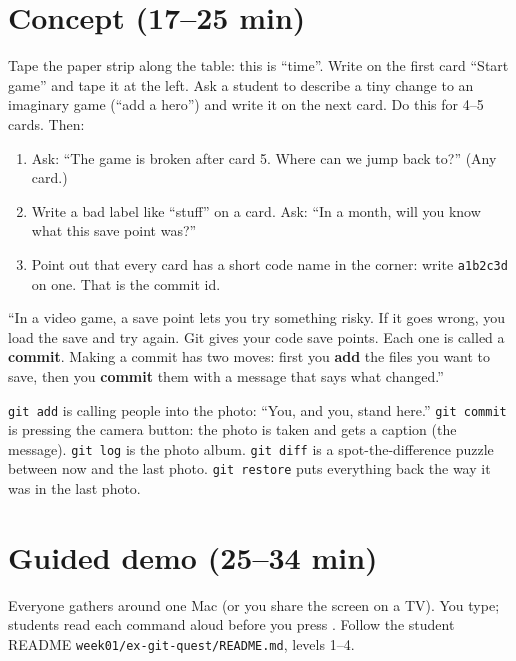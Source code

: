 \section{Concept (17--25 min)}
\begin{unplugged}
Tape the paper strip along the table: this is \enquote{time}. Write on the first card \enquote{Start game} and tape it at the left. Ask a student to describe a tiny change to an imaginary game (\enquote{add a hero}) and write it on the next card. Do this for 4--5 cards. Then:
\begin{enumerate}[itemsep=1pt]
  \item Ask: \enquote{The game is broken after card 5. Where can we jump back to?} (Any card.)
  \item Write a bad label like \enquote{stuff} on a card. Ask: \enquote{In a month, will you know what this save point was?}
  \item Point out that every card has a short code name in the corner: write \texttt{a1b2c3d} on one. That is the commit id.
\end{enumerate}
\end{unplugged}

\begin{teacherscript}
\enquote{In a video game, a save point lets you try something risky. If it goes wrong, you load the save and try again. Git gives your code save points. Each one is called a \textbf{commit}. Making a commit has two moves: first you \textbf{add} the files you want to save, then you \textbf{commit} them with a message that says what changed.}
\end{teacherscript}

\begin{analogy}
\texttt{git add} is calling people into the photo: \enquote{You, and you, stand here.} \texttt{git commit} is pressing the camera button: the photo is taken and gets a caption (the message). \texttt{git log} is the photo album. \texttt{git diff} is a spot-the-difference puzzle between now and the last photo. \texttt{git restore} puts everything back the way it was in the last photo.
\end{analogy}

\section{Guided demo (25--34 min)}
Everyone gathers around one Mac (or you share the screen on a TV). You type; students read each command aloud before you press . Follow the student README \texttt{week01/ex-git-quest/README.md}, levels 1--4.

